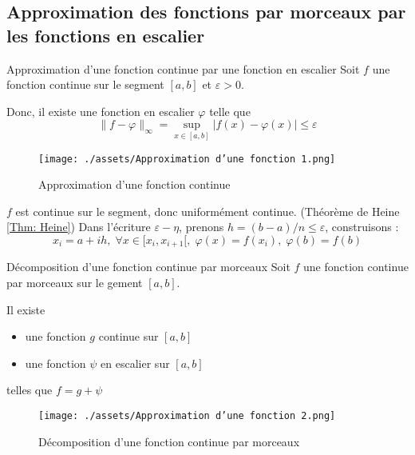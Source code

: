 \subsection{Approximation des fonctions par morceaux par les fonctions en escalier} %
\label{sub:Approximation des fonctions par morceaux par les fonctions en escalier}

\begin{Theorem}{Approximation d'une fonction continue par une fonction en escalier}{}
  Soit $f$ une fonction continue sur le segment $[a,b]$ et $\varepsilon>0$. 

  Donc, il existe une fonction en escalier $\varphi$ telle que 
  \[
    \| f- \varphi \| _{\infty}  = \sup _{x \in [a,b]} |f(x) - \varphi(x)|\le \varepsilon
  \]

  \begin{figure}[H] %
    \centering
    \texttt{[image: ./assets/Approximation d'une fonction 1.png]}
    \caption{Approximation d'une fonction continue}
  \end{figure}

  
\end{Theorem}

\begin{myproof}{}{}
  $f$ est continue sur le segment, donc uniformément continue. (Théorème de Heine \ref{Thm: Heine}) Dans l'écriture $\varepsilon - \eta$, prenons $h = (b-a)/n \le \varepsilon$, construisons :
  \begin{equation}
    x_i = a + ih,\; \forall x \in [x_i,x _{i+1}[ , \; \varphi(x) = f(x_i),\; \varphi(b) = f(b)
  \end{equation}
\end{myproof}


\begin{Lenma}{Décomposition d'une fonction continue par morceaux}{}
  Soit $f$ une fonction continue par morceaux sur le gement $[a,b]$. 

Il existe 
\begin{itemize}

  \item une fonction $g$ continue sur $[a,b]$ 
  \item une fonction $\psi$ en escalier sur $[a,b]$

\end{itemize}
telles que $f = g + \psi$
  \begin{figure}[H] %
    \centering
    \texttt{[image: ./assets/Approximation d'une fonction 2.png]}
    \caption{Décomposition d'une fonction continue par morceaux}
  \end{figure}
\end{Lenma}


